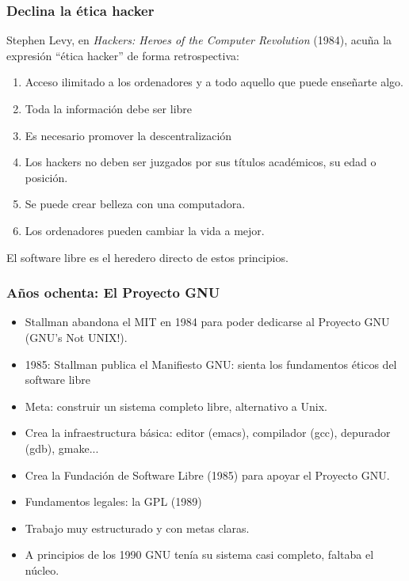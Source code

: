 \documentclass{beamer}
\begin{document}

\begin{frame}
\frametitle{Declina la ética hacker}

Stephen Levy, en \textit{Hackers: Heroes of the Computer Revolution} (1984), acuña la expresión ``ética hacker'' de forma retrospectiva:

\begin{enumerate}
\item Acceso ilimitado a los ordenadores y a todo aquello que puede enseñarte algo.
\item Toda la información debe ser libre
\item Es necesario promover la descentralización
\item Los hackers no deben ser juzgados por sus títulos académicos, su edad o posición.
\item Se puede crear belleza con una computadora.
\item Los ordenadores pueden cambiar la vida a mejor.
\end{enumerate}

\pause

\begin{center}
\alert{El software libre es el heredero directo de estos principios.}
\end{center}

\end{frame}


\begin{frame}
\frametitle{Años ochenta: El Proyecto GNU}


\begin{itemize}
\item Stallman abandona el MIT en 1984 para poder dedicarse al Proyecto GNU (GNU's Not UNIX!). 
\item 1985: Stallman publica el Manifiesto GNU: sienta los fundamentos éticos del software libre
\item Meta: construir un sistema completo libre, alternativo a Unix.
\item Crea la infraestructura básica: editor (emacs), compilador (gcc), depurador (gdb), gmake... 
\item Crea la Fundación de Software Libre (1985) para apoyar el Proyecto GNU.
\item Fundamentos legales: la GPL (1989)
\item Trabajo muy estructurado y con metas claras.
\item A principios de los 1990 GNU tenía su sistema casi completo, faltaba el núcleo.

\end{itemize}

\end{frame}
\end{document}
